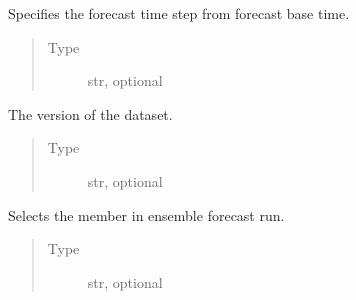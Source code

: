 \documentclass[letterpaper,10pt,english]{sphinxmanual}
\begin{document}
\begin{fulllineitems}
\begin{fulllineitems}
\end{fulllineitems}


\begin{fulllineitems}
\label{\detokenize{api:MarsRetrieval.MarsRetrieval.step}}
Specifies the forecast time step from forecast base time.
\begin{quote}\begin{description}
\item[{Type}] \leavevmode
str, optional

\end{description}\end{quote}

\end{fulllineitems}


\begin{fulllineitems}
\label{\detokenize{api:MarsRetrieval.MarsRetrieval.expver}}
The version of the dataset.
\begin{quote}\begin{description}
\item[{Type}] \leavevmode
str, optional

\end{description}\end{quote}

\end{fulllineitems}


\begin{fulllineitems}
\label{\detokenize{api:MarsRetrieval.MarsRetrieval.number}}
Selects the member in ensemble forecast run.
\begin{quote}\begin{description}
\item[{Type}] \leavevmode
str, optional

\end{description}\end{quote}


\end{fulllineitems}
\end{fulllineitems}
\end{document}
